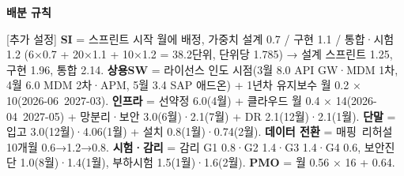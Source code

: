 \documentclass[10pt,a4paper]{article}
\begin{document}
\clearpage
{}
\noindent\textbf{\small 배분 규칙} \par\vspace{1mm}
\begin{fieldbox}
\ifwbblank
{}\par\vspace{2.5mm}\par\vspace{2.5mm}\par\vspace{2.5mm}\par\vspace{2.5mm}\par\vspace{2.5mm}\par\vspace{2.5mm}\par
\else
\small [추가 설정] \textbf{SI} = 스프린트 시작 월에 배정, 가중치 설계 0.7 / 구현 1.1 / 통합·시험 1.2 (6×0.7 + 20×1.1 + 10×1.2 = 38.2단위, 단위당 1.785) → 설계 스프린트 1.25, 구현 1.96, 통합 2.14. \textbf{상용SW} = 라이선스 인도 시점(3월 8.0 API GW·MDM 1차, 4월 6.0 MDM 2차·APM, 5월 3.4 SAP 애드온) + 1년차 유지보수 월 0.2 × 10(2026-06~2027-03). \textbf{인프라} = 선약정 6.0(4월) + 클라우드 월 0.4 × 14(2026-04~2027-05) + 망분리·보안 3.0(6월)·2.1(7월) + DR 2.1(12월)·2.1(1월). \textbf{단말} = 입고 3.0(12월)·4.06(1월) + 설치 0.8(1월)·0.74(2월). \textbf{데이터 전환} = 매핑~리허설 10개월 0.6→1.2→0.8. \textbf{시험·감리} = 감리 G1 0.8·G2 1.4·G3 1.4·G4 0.6, 보안진단 1.0(8월)·1.4(1월), 부하시험 1.5(1월)·1.6(2월). \textbf{PMO} = 월 0.56 × 16 + 0.64.
\fi
\end{fieldbox}
\end{document}
